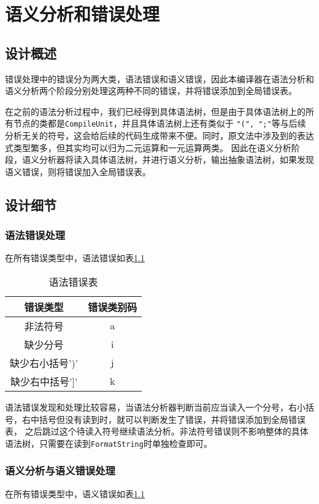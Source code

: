 \chapter{语义分析和错误处理}
\section{设计概述}

错误处理中的错误分为两大类，语法错误和语义错误，因此本编译器在语法分析和语义分析两个阶段分别处理这两种不同的错误，并将错误添加到全局错误表。

在之前的语法分析过程中，我们已经得到具体语法树，但是由于具体语法树上的所有节点的类都是\texttt{CompileUnit}，并且具体语法树上还有类似于
\texttt{"(", ";"}等与后续分析无关的符号，这会给后续的代码生成带来不便。同时，原文法中涉及到的表达式类型繁多，但其实均可以归为二元运算和一元运算两类。
因此在语义分析阶段，语义分析器将读入具体语法树，并进行语义分析，输出抽象语法树，如果发现语义错误，则将错误加入全局错误表。

\section{设计细节}
\subsection{语法错误处理}

在所有错误类型中，语法错误如表\ref{table:syntax}

\begin{table}[H] 
    \centering
    \begin{tabular}{cc}
    \toprule 
    错误类型 & 错误类别码  \\
    \midrule
    非法符号 & a  \\
    缺少分号 & i  \\
    缺少右小括号')' & j\\
    缺少右中括号']' & k \\
    \bottomrule %
    \end{tabular}
    \caption{语法错误表}
    \label{table:syntax}
\end{table}

语法错误发现和处理比较容易，当语法分析器判断当前应当读入一个分号，右小括号，右中括号但没有读到时，就可以判断发生了错误，并将错误添加到全局错误表，
之后跳过这个待读入符号继续语法分析。非法符号错误则不影响整体的具体语法树，只需要在读到\texttt{FormatString}时单独检查即可。
\subsection{语义分析与语义错误处理}
在所有错误类型中，语义错误如表\ref{table:syntax}

